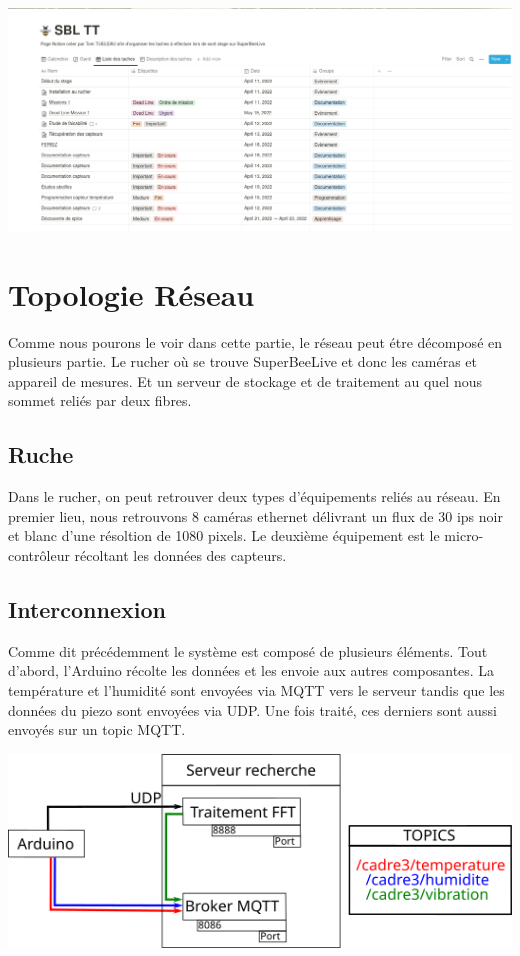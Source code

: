 \documentclass[12pt,french,a4paper]{article}
\begin{document}
\begin{center}	
\includegraphics[scale=0.35]{../img/notionlistesdestaches.png}
\label{Liste des taches}
\end{center}
\newpage

\section{Topologie Réseau}
Comme nous pourons le voir dans cette partie, le réseau peut étre décomposé en plusieurs partie. Le rucher où se trouve SuperBeeLive et donc les caméras et appareil de mesures. Et un serveur de stockage et de traitement au quel nous sommet reliés par deux fibres. 
\subsection{Ruche}
Dans le rucher, on peut retrouver deux types d'équipements reliés au réseau. En premier lieu, nous retrouvons 8 caméras ethernet délivrant un flux de 30 ips noir et blanc d'une résoltion de 1080 pixels. Le deuxième équipement est le micro-contrôleur récoltant les données des capteurs.  
\subsection{Interconnexion}
Comme dit précédemment le système est composé de plusieurs éléments. Tout d'abord, l'Arduino récolte les données et les envoie aux autres composantes. La température et l'humidité sont envoyées via MQTT vers le serveur tandis que les données du piezo sont envoyées via UDP. Une fois traité, ces derniers sont aussi envoyés sur un topic MQTT.

\begin{center}
    \includegraphics[scale=1]{../img/schemaNet.png}
    \label{SN}
\end{center}
\end{document}
